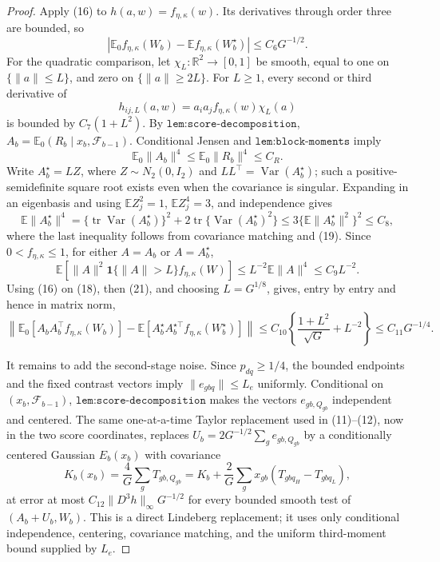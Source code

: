 \documentclass{article}
\begin{document}
\begin{proof}
Apply (16) to \(h(a,w)=f_{\eta,\kappa}(w)\).  Its derivatives through order three are bounded, so
\[
 \left|\mathbb E_0f_{\eta,\kappa}(W_b)
       -\mathbb Ef_{\eta,\kappa}(W_b^\star)\right|
 \leq C_6G^{-1/2}.                                                        \tag{17}
\]
For the quadratic comparison, let \(\chi_L:\mathbb R^2\to[0,1]\) be smooth, equal to one on \(\{\|a\|\leq L\}\), and zero on \(\{\|a\|\geq2L\}\).  For \(L\geq1\), every second or third derivative of
\[
 h_{ij,L}(a,w)=a_ia_jf_{\eta,\kappa}(w)\chi_L(a)                        \tag{18}
\]
is bounded by \(C_7(1+L^2)\).  By \(\texttt{lem:score-decomposition}\),
\(
 A_b=\mathbb E_0(R_b\mid x_b,\mathcal F_{b-1})
\).  Conditional Jensen and \(\texttt{lem:block-moments}\) imply
\[
 \mathbb E_0\|A_b\|^4\leq\mathbb E_0\|R_b\|^4\leq C_R.               \tag{19}
\]
Write \(A_b^\star=LZ\), where \(Z\sim N_2(0,I_2)\) and \(LL^\top=\operatorname{Var}(A_b^\star)\); such a positive-semidefinite square root exists even when the covariance is singular.  Expanding in an eigenbasis and using \(\mathbb EZ_j^2=1\), \(\mathbb EZ_j^4=3\), and independence gives
\[
 \mathbb E\|A_b^\star\|^4
 =\{\operatorname{tr}\operatorname{Var}(A_b^\star)\}^2
   +2\operatorname{tr}\{\operatorname{Var}(A_b^\star)^2\}
 \leq3\{\mathbb E\|A_b^\star\|^2\}^2\leq C_8,                       \tag{20}
\]
where the last inequality follows from covariance matching and (19).  Since \(0<f_{\eta,\kappa}\leq1\), for either \(A=A_b\) or \(A=A_b^\star\),
\[
 \mathbb E\!\left[\|A\|^2\mathbf1\{\|A\|>L\}
                   f_{\eta,\kappa}(W)\right]
 \leq L^{-2}\mathbb E\|A\|^4\leq C_9L^{-2}.                           \tag{21}
\]
Using (16) on (18), then (21), and choosing \(L=G^{1/8}\), gives, entry by entry and hence in matrix norm,
\[
 \left\|\mathbb E_0[A_bA_b^\top f_{\eta,\kappa}(W_b)]
 -\mathbb E[A_b^\star A_b^{\star\top}f_{\eta,\kappa}(W_b^\star)]
 \right\|
 \leq C_{10}\left\{\frac{1+L^2}{\sqrt G}+L^{-2}\right\}
 \leq C_{11}G^{-1/4}.                                                     \tag{22}
\]

It remains to add the second-stage noise.  Since \(p_{dq}\geq1/4\), the bounded endpoints and the fixed contrast vectors imply \(\|e_{gbq}\|\leq L_e\) uniformly.  Conditional on \((x_b,\mathcal F_{b-1})\), \(\texttt{lem:score-decomposition}\) makes the vectors \(e_{gb,Q_{gb}}\) independent and centered.  The same one-at-a-time Taylor replacement used in (11)--(12), now in the two score coordinates, replaces
\(
 U_b=2G^{-1/2}\sum_ge_{gb,Q_{gb}}
\)
by a conditionally centered Gaussian \(E_b(x_b)\) with covariance
\[
 K_b(x_b)=\frac4G\sum_gT_{gb,Q_{gb}}
 =K_b+\frac2G\sum_gx_{gb}(T_{gbq_H}-T_{gbq_L}),                         \tag{23}
\]
at error at most \(C_{12}\|D^3h\|_\infty G^{-1/2}\) for every bounded smooth test of \((A_b+U_b,W_b)\).  This is a direct Lindeberg replacement; it uses only conditional independence, centering, covariance matching, and the uniform third-moment bound supplied by \(L_e\).


\end{proof}
\end{document}
